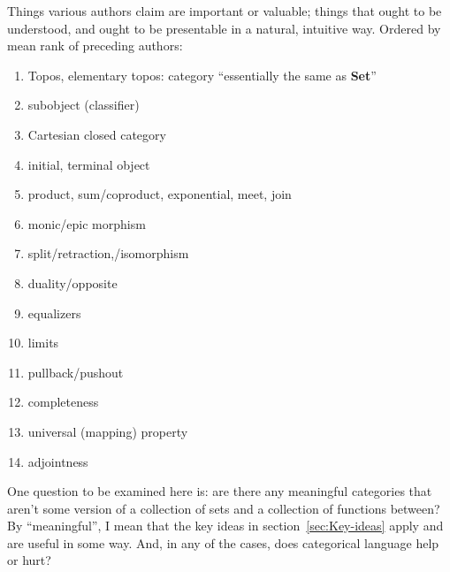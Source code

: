 \documentclass[11pt,openany]{book}
\begin{document}
Things various authors claim are important or valuable;
things that ought to be understood,
and ought to be presentable in a natural, intuitive way.
Ordered by mean rank of preceding authors:
\begin{enumerate}
  \item Topos, elementary topos: 
  category ``essentially the same as \textbf{Set}''
  \item subobject (classifier)
  \item Cartesian closed category
  \item initial, terminal object
  \item product, sum/coproduct, exponential, meet, join
  \item monic/epic morphism
  \item split/retraction,/isomorphism
  \item duality/opposite
  \item equalizers
  \item limits
  \item pullback/pushout
  \item completeness
  \item universal (mapping) property
  \item adjointness
\end{enumerate}

\setcounter{currentlevel}{\value{baseSectionLevel}}
\label{sec:Example-categories}

One question to be examined here is: are there any meaningful
categories that aren't some version of a collection of sets
and a collection of functions between? 
By ``meaningful'', I mean that the key ideas 
in section~\ref{sec:Key-ideas} apply
and are useful in some way.
And, in any of the cases, 
does categorical language help or hurt?
\end{document}
